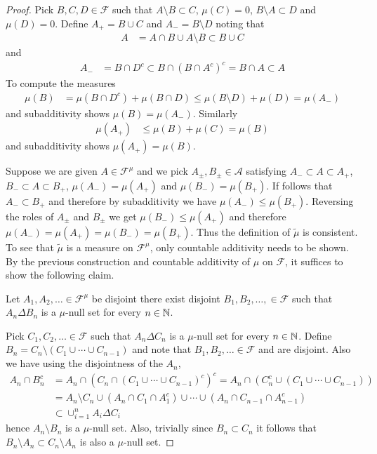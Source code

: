 \begin{proof}
Pick $B, C, D \in \mathcal{F}$  such that $A \setminus B \subset C$,
$\mu(C)=0$, $B \setminus A \subset D$  and $\mu(D) = 0$.  Define
$A_+ = B \cup C$ and $A_- = B \setminus D$  noting that
\begin{align*}
A &= A \cap B \cup A \setminus B  \subset B \cup C
\end{align*}
and
\begin{align*}
A_- &= B \cap D^c \subset B \cap (B \cap A^c)^c  = B \cap A \subset A
\end{align*}
To compute the measures
\begin{align*}
\mu(B) &= \mu(B \cap D^c) + \mu(B \cap D) \leq \mu(B \setminus D) + \mu(D) = \mu(A_-)
\end{align*}
and subadditivity shows $\mu(B) = \mu(A_-)$.  Similarly 
\begin{align*}
\mu(A_+) &\leq \mu(B) + \mu(C) = \mu(B)
\end{align*}
and subadditivity shows $\mu(A_+) = \mu(B)$.

Suppose we are given $A \in \mathcal{F}^\mu$ and we pick $A_\pm, B_\pm \in \mathcal{A}$ satisfying $A_- \subset A \subset A_+$,  $B_- \subset A \subset B_+$, $\mu(A_-) = \mu(A_+)$ and $\mu(B_-) = \mu(B_+)$.  If follows that $A_- \subset B_+$ and therefore by subadditivity we have $\mu(A_-) \leq \mu(B_+)$.  Reversing the roles of $A_\pm$ and $B_\pm$ we get $\mu(B_-) \leq \mu(A_+)$ and therefore $\mu(A_-) = \mu(A_+) = \mu(B_-) = \mu(B_+)$.  Thus the definition of $\tilde{\mu}$ is consistent.
To see that $\tilde{\mu}$ is a measure on $\mathcal{F}^{\mu}$, only countable additivity needs to 
be shown.  By the previous construction and countable additivity of $\mu$ on $\mathcal{F}$, it suffices to show the following claim.
\begin{clm} Let $A_1, A_2, \dotsc \in \mathcal{F}^{\mu}$ be disjoint there exist disjoint $B_1, B_2, \dotsc, \in \mathcal{F}$ such that
$A_n \Delta B_n$ is a $\mu$-null set for every $n \in \mathbb{N}$.
\end{clm}
Pick $C_1, C_2, \dotsc \in \mathcal{F}$ such
that $A_n \Delta C_n$ is a $\mu$-null set for every $n \in \mathbb{N}$.  Define $B_n = C_n \setminus (C_1 \cup \dotsb \cup C_{n-1})$ and note
that $B_1, B_2, \dotsc \in \mathcal{F}$ and are disjoint.  Also we have using the disjointness of the $A_n$,
\begin{align*}
A_n \cap B_n^c &= A_n \cap (C_n \cap (C_1 \cup \dotsb \cup C_{n-1})^c)^c = A_n \cap (C^c_n \cup (C_1 \cup \dotsb \cup C_{n-1})) \\
&= A_n \setminus C_n \cup (A_n \cap C_1 \cap A_1^c) \cup \dotsb \cup (A_n \cap C_{n-1} \cap A_{n-1}^c)  \\
&\subset \cup_{i=1}^n A_i \Delta C_i
\end{align*}
hence $A_n \setminus B_n$ is a $\mu$-null set.
Also, trivially since $B_n \subset C_n$ it follows that $B_n \setminus A_n \subset C_n \setminus A_n$ is also a $\mu$-null set.


\end{proof}
